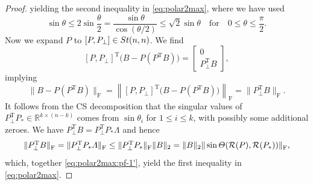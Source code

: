 \documentclass[11pt]{article}
\def\bbR{\mathbb{R}}
\def\cR{{\cal R}}
\def\wtd{\widetilde}
\newcommand\STM[2]{{\rm St}(#1,#2)}
\DeclareMathOperator{\F}{F}
\DeclareMathOperator{\T}{T}
\theoremstyle{definition}
\numberwithin{equation}{section}
\begin{document}
\begin{proof}
yielding the second inequality in \eqref{eq:polar2max}, where we have used
$$
\sin\theta\le 2\sin\frac {\theta}2=\frac {\sin\theta}{\cos(\theta/2)}\le\sqrt 2\sin\theta
\quad\mbox{for}\quad 0\le\theta\le\frac {\pi}2.
$$
Now we expand $P$ to $[P,P_{\bot}]\in\STM{n}{n}$. We find
$$
[P,P_{\bot}]^{\T}\big(B-P(P^{\T}B)\big)=\begin{bmatrix}
                                    0 \\
                                    P_{\bot}^{\T}B
                                  \end{bmatrix},
$$
implying
\begin{equation}\label{eq:polar2max:pf-1'}
\|B-P(P^{\T}B)\|_{\F}=\left\|[P,P_{\bot}]^{\T}\big(B-P(P^{\T}B)\big)\right\|_{\F}=\|P_{\bot}^{\T}B\|_{\F}.
\end{equation}
It follows from the CS decomposition \cite{stsu:1990} that the singular values of $P_{\bot}^{\T}P_*\in\bbR^{k\times (n-k)}$ comes from
$\sin\theta_i$ for $1\le i\le k$, with possibly some additional zeroes.
We have
$P_{\bot}^{\T}B=P_{\bot}^{\T}P_*\Lambda$ and hence
$$
\|P_{\bot}^{\T}B\|_{\F}=\|P_{\bot}^{\T}P_*\Lambda\|_{\F}
    \le\|P_{\bot}^{\T}P_*\|_{\F}\|B\|_2=\|B\|_2\|\sin\Theta(\cR(P),\cR(P_*))\|_{\F},
$$
which, together \eqref{eq:polar2max:pf-1'}, yield the first inequality in \eqref{eq:polar2max}.


\end{proof}
\end{document}
